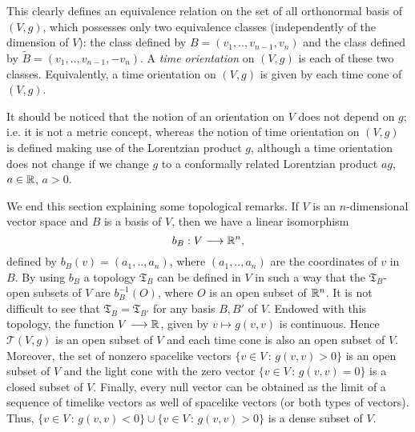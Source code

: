 \vspace{2mm}

This clearly defines an equivalence relation on the set of all orthonormal basis of $(V,g)$, which possesses
only two equivalence classes (independently of the dimension of $V$): the class defined by $B=(v_1,..,v_{n-1},v_n)$
and the class defined by $\tilde{B}=(v_1,..,v_{n-1},-v_n)$. A \emph{time orientation} on $(V,g)$ is each of these
two classes. Equivalently, a time orientation on $(V,g)$ is given by each time cone of $(V,g)$.

\vspace{2mm}

It should be noticed that the notion of an orientation on $V$ does not depend on $g$; i.e. it is not
a metric concept, whereas the notion of time orientation on $(V,g)$ is defined making use of the Lorentzian
product $g$, although a time orientation does not change if we change $g$ to a conformally related Lorentzian product
$ag$, $a\in \mathbb{R}$, $a>0$.

\vspace{2mm}

We end this section explaining some topological remarks. If $V$ is an $n$-dimensional vector space and $B$ is a basis of $V$, then we have a linear isomorphism $$b_B : V \longrightarrow \mathbb{R}^n,$$ defined by $b_B(v)=(a_1,..,a_n)$, where $(a_1,..,a_n)$ are the coordinates of $v$ in $B$. By using $b_B$ a topology $\mathfrak{T}_B$ can be defined in $V$ in such a way that the $\mathfrak{T}_B$-open subsets of $V$ are $b_B^{-1}(O)$, where $O$ is an open subset of $\mathbb{R}^n$. It is not difficult to see that $\mathfrak{T}_B = \mathfrak{T}_{B'}$ for any basis $B,B'$ of $V$. Endowed with this topology, the function $V \longrightarrow \mathbb{R}$, given by $v \mapsto g(v,v)$ is continuous. Hence $\mathcal{T}(V,g)$ is an open subset of $V$ and each time cone is also an open subset of $V$. Moreover, the set of nonzero spacelike vectors $\{v\in V \, : \, g(v,v)>0 \}$ is an open subset of $V$ and the light cone with the zero vector $\{v\in V \, : \, g(v,v)=0 \}$ is a closed subset of $V$. Finally, every null vector can be obtained as the limit of a sequence of timelike vectors as well of spacelike vectors (or both types of vectors). Thus, $\{v\in V \, : \, g(v,v)<0 \} \cup \{v\in V \, : \, g(v,v)>0 \}$
is a dense subset of $V$.
